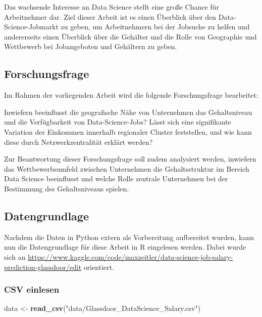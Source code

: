 \documentclass[
]{article}
\newenvironment{Shaded}{\begin{snugshade}}{\end{snugshade}}
\newcommand{\FunctionTok}[1]{\textcolor[rgb]{0.13,0.29,0.53}{\textbf{#1}}}
\newcommand{\NormalTok}[1]{#1}
\newcommand{\OtherTok}[1]{\textcolor[rgb]{0.56,0.35,0.01}{#1}}
\newcommand{\StringTok}[1]{\textcolor[rgb]{0.31,0.60,0.02}{#1}}
\begin{document}
Das wachsende Interesse an Data Science stellt eine große Chance für
Arbeitnehmer dar. Ziel dieser Arbeit ist es einen Überblick über den
Data-Science-Jobmarkt zu geben, um Arbeitnehmern bei der Jobsuche zu
helfen und andererseits einen Überblick über die Gehälter und die Rolle
von Geographie und Wettbewerb bei Jobangeboten und Gehältern zu geben.

\subsection{Forschungsfrage}\label{forschungsfrage}

Im Rahmen der vorliegenden Arbeit wird die folgende Forschungsfrage
bearbeitet:

Inwiefern beeinflusst die geografische Nähe von Unternehmen das
Gehaltsniveau und die Verfügbarkeit von Data-Science-Jobs? Lässt sich
eine signifikante Variation der Einkommen innerhalb regionaler Cluster
feststellen, und wie kann diese durch Netzwerkzentralität erklärt
werden?

Zur Beantwortung dieser Forschungsfrage soll zudem analysiert werden,
inwiefern das Wettbewerbsumfeld zwischen Unternehmen die Gehaltsstruktur
im Bereich Data Science beeinflusst und welche Rolle zentrale
Unternehmen bei der Bestimmung des Gehaltsniveaus spielen.

\subsection{Datengrundlage}\label{datengrundlage}

Nachdem die Daten in Python extern als Vorbereitung aufbereitet wurden,
kann nun die Datengrundlage für diese Arbeit in R eingelesen werden.
Dabei wurde sich an
\url{https://www.kaggle.com/code/maxzeitler/data-science-job-salary-prediction-glassdoor/edit}
orientiert.

\subsubsection{CSV einlesen}\label{csv-einlesen}

\begin{Shaded}
\begin{Highlighting}[]
\NormalTok{data }\OtherTok{\textless{}{-}} \FunctionTok{read\_csv}\NormalTok{(}\StringTok{"data/Glassdoor\_DataScience\_Salary.csv"}\NormalTok{)}
\end{Highlighting}
\end{Shaded}
\end{document}
